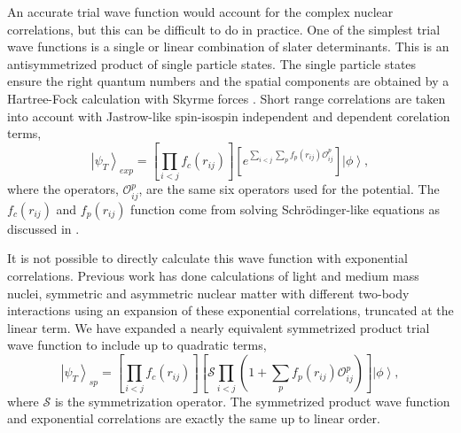 \documentclass[12pt]{article}
\newcommand{\ket}[1]{\left| #1 \right>}
\newcommand{\fpij}{f_p(r_{ij})}
\newcommand{\Opij}{\mathcal{O}_{ij}^p}
\begin{document}
An accurate trial wave function would account for the complex nuclear correlations, but this can be difficult to do in practice. One of the simplest trial wave functions is a single or linear combination of slater determinants. This is an antisymmetrized product of single particle states. The single particle states ensure the right quantum numbers and the spatial components are obtained by a Hartree-Fock calculation with Skyrme forces \cite{gandolfi2014}. Short range correlations are taken into account with Jastrow-like spin-isospin independent and dependent corelation terms,
\begin{equation}
   \ket{\psi_T}_{exp} = \left[\prod\limits_{i<j}f_c(r_{ij})\right] \left[e^{\sum\limits_{i<j}\sum\limits_p\fpij\Opij}\right] \ket{\phi},
\end{equation}
   where the operators, $\Opij$, are the same six operators used for the potential. The $f_c(r_{ij})$ and $f_p(r_{ij})$ function come from solving Schr\"odinger-like equations as discussed in \cite{pandharipande1979}.

It is not possible to directly calculate this wave function with exponential correlations. Previous work \cite{gandolfi2014} has done calculations of light and medium mass nuclei, symmetric and asymmetric nuclear matter with different two-body interactions using an expansion of these exponential correlations, truncated at the linear term. We have expanded a nearly equivalent symmetrized product trial wave function to include up to quadratic terms,
\begin{equation}
   \ket{\psi_T}_{sp} = \left[\prod\limits_{i<j}f_c(r_{ij})\right]\left[\mathcal{S}\prod\limits_{i<j}\left(1+\sum\limits_p \fpij\Opij\right)\right]\ket{\phi},
\end{equation}
where $\mathcal{S}$ is the symmetrization operator. The symmetrized product wave function and exponential correlations are exactly the same up to linear order.
\end{document}
